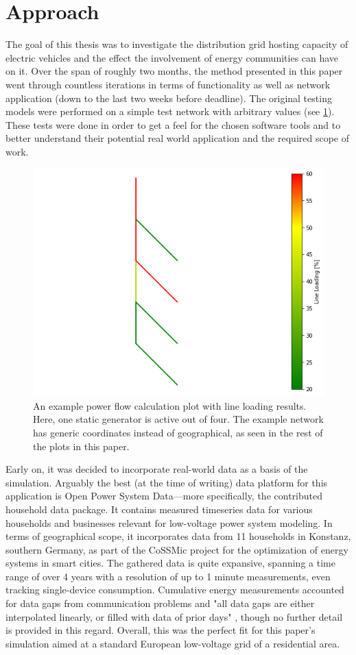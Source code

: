 \documentclass[a4paper,10pt]{report}
\begin{document}
\section{Approach}\label{section_approach}
The goal of this thesis was to investigate the distribution grid hosting capacity of electric vehicles and the effect the involvement of energy communities can have on it. Over the span of roughly two months, the method presented in this paper went through countless iterations in terms of functionality as well as network application (down to the last two weeks before deadline). The original testing models were performed on a simple test network with arbitrary values (see \cref{test_network}). These tests were done in order to get a feel for the chosen software tools and to better understand their potential real world application and the required scope of work.

\begin{figure}[htpb]
	\centering
	\includegraphics[width=0.46\linewidth]{test_network}
	\caption[Example power flow network with generic coordinates]{An example power flow calculation plot with line loading results. Here, one static generator is active out of four. The example network has generic coordinates instead of geographical, as seen in the rest of the plots in this paper.}
	\label{test_network}
\end{figure}

Early on, it was decided to incorporate real-world data as a basis of the simulation. Arguably the best (at the time of writing) data platform for this application is Open Power System Data---more specifically, the contributed household data package. It contains measured timeseries data for various households and businesses relevant for low-voltage power system modeling. In terms of geographical scope, it incorporates data from 11 households in Konstanz, southern Germany, as part of the CoSSMic project for the optimization of energy systems in smart cities. The gathered data is quite expansive, spanning a time range of over 4 years with a resolution of up to 1 minute measurements, even tracking single-device consumption. Cumulative energy measurements accounted for data gaps from communication problems and "all data gaps are either interpolated linearly, or filled with data of prior days" \cite{OpenPowerSystemData}, though no further detail is provided in this regard. Overall, this was the perfect fit for this paper's simulation aimed at a standard European low-voltage grid of a residential area.
\end{document}
